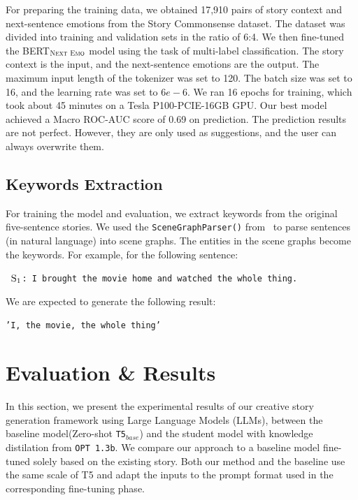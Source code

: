 \documentclass{article} %
\begin{document}
For preparing the training data, we obtained 17,910 pairs of story context and next-sentence emotions from the Story Commonsense dataset. The dataset was divided into training and validation sets in the ratio of 6:4. We then fine-tuned the BERT$_{\textsc{Next Emo}}$ model %
using the task of multi-label classification. The story context is the input, and the next-sentence emotions are the output. The maximum input length of the tokenizer was set to 120. The batch size was set to 16, and the learning rate was set to $6e-6$. We ran 16 epochs for training, which took about 45 minutes on a Tesla P100-PCIE-16GB GPU. Our best model achieved a Macro ROC-AUC score of 0.69 on prediction. The prediction results are not perfect. However, they are only used as suggestions, and the user can always overwrite them. 

\subsection{Keywords Extraction}
For training the model and evaluation, we extract keywords from the original five-sentence stories. We used the \texttt{SceneGraphParser()} from~\cite{wu2019unified} to parse sentences (in natural language) into scene graphs. The entities in the scene graphs become the keywords. For example, for the following sentence: 
\begin{center}
    \texttt{
    $\textsc{S}_1$: I brought the movie home and watched the whole thing.
    }
\end{center}
We are expected to generate the following result:
\begin{center}
    \texttt{'I, the movie, the whole thing'}
\end{center}

\section{Evaluation \& Results}
In this section, we present the experimental results of our creative story generation framework using Large Language Models (LLMs), between the baseline model(Zero-shot \texttt{T5$_{base}$}) and the student model with knowledge distilation from \texttt{OPT 1.3b}. We compare our approach to a baseline model fine-tuned solely based on the existing story. Both our method and the baseline use the same scale of T5 and adapt the inputs to the prompt format used in the corresponding fine-tuning phase.
\end{document}
